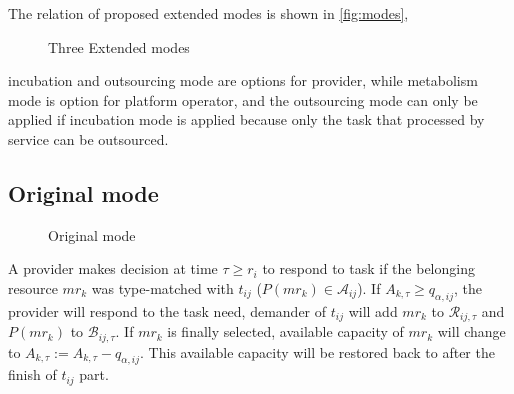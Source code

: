 The relation of proposed extended modes is shown in \autoref{fig:modes},
\begin{figure}[htbp]
    \centering
    \resizebox{\textwidth}{!}{}
    \caption{Three Extended modes}
    \label{fig:modes}
\end{figure}
incubation and outsourcing mode are options for provider, while metabolism mode is option for platform operator, and the outsourcing mode can only be applied if incubation mode is applied because only the task that processed by service can be outsourced.


\subsection{Original mode} %
\label{sub:interactions_and_decisions}

\begin{figure}[htbp]
    \centering
    \resizebox{0.9\textwidth}{!}{}
    \caption{Original mode}
    \label{fig:originmode}
\end{figure}

A provider makes decision at time $\tau\ge r_i$ to respond  to task if the belonging resource $mr_k$ was type-matched with $t_{ij}$ ($P(mr_k)\in\mathcal{A}_{ij}$). If $A_{k,\tau} \ge q_{\alpha,ij}$, the provider will respond to the task need, demander of $t_{ij}$ will add $mr_k$ to $\mathcal{R}_{ij,\tau}$ and $P(mr_k)$ to $\mathcal{B}_{ij,\tau}$. If $mr_k$ is finally selected, available capacity of $mr_k$ will change to $A_{k,\tau} := A_{k,\tau} - q_{\alpha,ij}$. This available capacity will be restored back to after the finish of $t_{ij}$ part.

